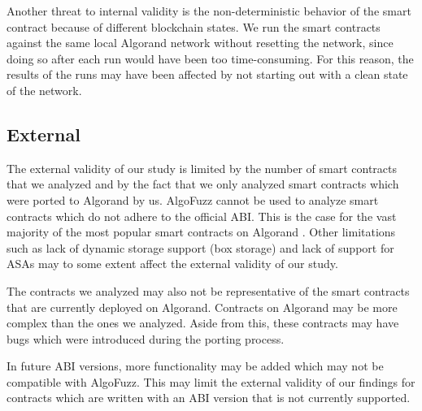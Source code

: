 Another threat to internal validity is the non-deterministic behavior of the smart contract because of different blockchain states.
We run the smart contracts against the same local Algorand network without resetting the network, since doing so after each run would have been too time-consuming.
For this reason, the results of the runs may have been affected by not starting out with a clean state of the network.

\subsection*{External}
The external validity of our study is limited by the number of smart contracts that we analyzed and by the fact that we only analyzed smart contracts which were ported to Algorand by us.
AlgoFuzz cannot be used to analyze smart contracts which do not adhere to the official \ac{ABI}.
This is the case for the vast majority of the most popular smart contracts on Algorand \cite{noauthor_algorand_nodate-6}.
Other limitations such as lack of dynamic storage support (box storage) and lack of support for \acp{ASA} may to some extent affect the external validity of our study.

The contracts we analyzed may also not be representative of the smart contracts that are currently deployed on Algorand.
Contracts on Algorand may be more complex than the ones we analyzed.
Aside from this, these contracts may have bugs which were introduced during the porting process.

In future \ac{ABI} versions, more functionality may be added which may not be compatible with AlgoFuzz.
This may limit the external validity of our findings for contracts which are written with an \ac{ABI} version that is not currently supported.
